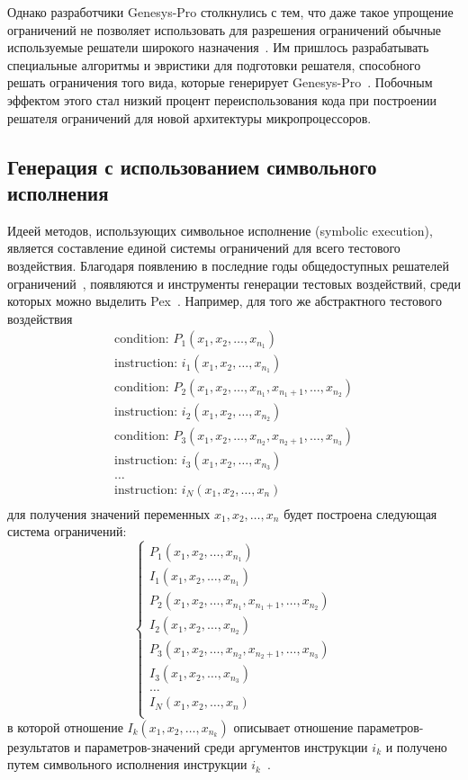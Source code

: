 Однако разработчики Genesys-Pro столкнулись с тем, что даже такое
упрощение ограничений не позволяет использовать для разрешения
ограничений обычные используемые решатели широкого
назначения~\cite{CLPusingECLiPSe}. Им пришлось разрабатывать
специальные алгоритмы и эвристики для подготовки решателя,
способного решать ограничения того вида, которые генерирует
Genesys-Pro~\cite{GenesysSolver}. Побочным эффектом этого стал
низкий процент переиспользования кода при построении решателя
ограничений для новой архитектуры микропроцессоров.

\subsection{Генерация с использованием символьного исполнения}
Идеей методов, использующих символьное исполнение (symbolic
execution), является составление единой системы ограничений для
всего тестового воздействия. Благодаря появлению в последние годы
общедоступных решателей ограничений~\cite{Z3, Yices}, появляются и
инструменты генерации тестовых воздействий, среди которых можно
выделить Pex~\cite{Pex}. Например, для того же абстрактного
тестового воздействия
$$
\begin{array}{l}
\mbox{condition: } P_1(x_1, x_2, \dots, x_{n_1})\\
\mbox{instruction: }i_1 (x_1, x_2, \dots, x_{n_1})\\
\mbox{condition: } P_2 (x_1, x_2, \dots, x_{n_1}, x_{n_1+1}, \dots, x_{n_2})\\
\mbox{instruction: }i_2 (x_1, x_2, \dots, x_{n_2})\\
\mbox{condition: } P_3(x_1, x_2, \dots, x_{n_2}, x_{n_2+1}, \dots, x_{n_3})\\
\mbox{instruction: }i_3 (x_1, x_2, \dots, x_{n_3})\\
\dots\\
\mbox{instruction: }i_N (x_1, x_2, \dots, x_n)\\
\end{array}
$$
для получения значений переменных $x_1, x_2, \dots, x_n$ будет
построена следующая система ограничений:
$$
\left\{\begin{array}{l}
P_1(x_1, x_2, \dots, x_{n_1})\\
I_1 (x_1, x_2, \dots, x_{n_1})\\
P_2 (x_1, x_2, \dots, x_{n_1}, x_{n_1+1}, \dots, x_{n_2})\\
I_2 (x_1, x_2, \dots, x_{n_2})\\
P_3(x_1, x_2, \dots, x_{n_2}, x_{n_2+1}, \dots, x_{n_3})\\
I_3 (x_1, x_2, \dots, x_{n_3})\\
\dots\\
I_N (x_1, x_2, \dots, x_n)\\
\end{array}\right.
$$
в которой отношение $I_k(x_1, x_2, \dots, x_{n_k})$ описывает
отношение параметров-результатов и параметров-значений среди
аргументов инструкции $i_k$ и получено путем символьного исполнения
инструкции $i_k$~\cite{symbolic_execution}.

